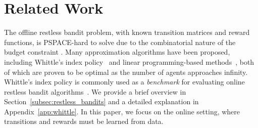 \section{Related Work}
The offline restless bandit problem, with known transition matrices and reward functions, is 
PSPACE-hard to solve due to the combinatorial nature of the budget constraint 
\citep{b0e74184-2114-3e45-b092-dfbc8fefcf91}.
Many approximation algorithms have been proposed,
including Whittle's index policy~\citep{whittle1988restless, Weber_Weiss_1990, 10.1109/ISIT.2018.8437712,7852321} and linear programming-based methods~\citep{verloop2016asymptotically,zhang2021restless,brown2023fluid,hong2024achievingexponentialasymptoticoptimality,gast2024linear}, both of which are proven to be optimal as the number of agents approaches infinity.
Whittle's index policy is commonly used as a \emph{benchmark} for evaluating online restless bandit algorithms~\citep{jung2019regret,wang2020restless, wang2023optimistic,akbarzadeh2023learning}. We provide a brief overview in Section~\ref{subsec:restless_bandits} and a detailed explanation in Appendix~\ref{app:whittle}.
In this paper, we focus on the online setting, where transitions and rewards must be learned from data.

